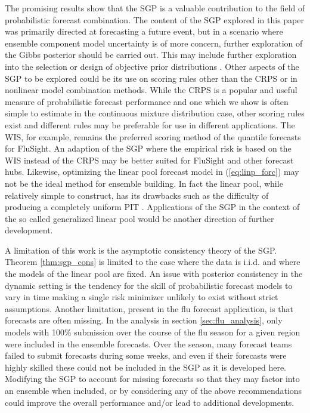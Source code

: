 The promising results show that the SGP is a valuable contribution to the 
field of probabilistic forecast combination. The content of the SGP explored 
in this paper was primarily directed at forecasting a future event, but in 
a scenario where ensemble component model uncertainty is of more concern, 
further exploration 
of the Gibbs posterior should be carried out. This may include further 
exploration into the selection or design of objective prior distributions 
\cite[]{giummole2019objective}. 
Other aspects of the SGP to be explored could be its use on scoring rules 
other than the CRPS or in nonlinear model combination methods. While the 
CRPS is a popular and useful measure of probabilistic forecast performance 
and one which we show is often simple to estimate in the continuous mixture 
distribution case, other scoring rules exist and different rules may be 
preferable for use in different applications. The WIS, for example, remains 
the preferred scoring method of the quantile forecasts for FluSight. An 
adaption of the SGP where the empirical risk is based on the WIS instead of 
the CRPS may be better suited for FluSight and other forecast hubs. Likewise, 
optimizing the linear pool forecast model in (\ref{eq:linp_forc}) may not 
be the ideal method for ensemble building. In fact the linear pool, while 
relatively simple to construct, has its drawbacks such as the difficulty of 
producing a completely uniform PIT \cite[]{gneiting2013combining}. 
Applications of the SGP in the context of the so called generalized linear 
pool would be another direction of further development.

A limitation of this work is the asymptotic consistency theory of the SGP. 
Theorem \ref{thm:sgp_cons} is limited to the case where the data is i.i.d. 
and where the models of the linear pool are fixed. An issue with posterior 
consistency in the dynamic setting is the tendency for the skill of 
probabilistic forecast models to vary in time making a single risk minimizer 
unlikely to exist without strict assumptions. Another limitation, present in 
the flu forecast application, is that forecasts are often missing. In the 
analysis in section \ref{sec:flu_analysis}, only models with 100\% submission 
over the course of the flu season for a given region were included in 
the ensemble forecasts. Over the 
season, many forecast teams failed to submit forecasts during some weeks, 
and even if their forecasts were highly skilled these could not be included 
in the SGP 
as it is developed here. Modifying the SGP to account for missing forecasts 
so that they may factor into an ensemble when included, or by considering 
any of the above recommendations could improve the overall performance 
and/or lead to additional developments.





